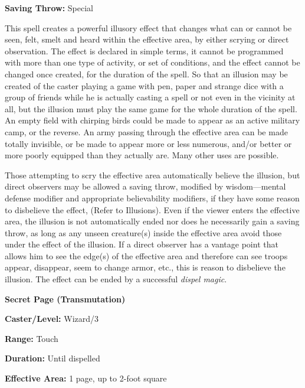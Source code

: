 \begin{multicols}{2}
\begin{minipage}{\columnwidth}
\noindent \textbf{Saving Throw:} Special

\end{minipage}

This spell creates a powerful illusory effect that changes what can or cannot be seen, felt, smelt and heard within the effective area, by either scrying or direct observation.  The effect is declared in simple terms, it cannot be programmed with more than one type of activity, or set of conditions, and the effect cannot be changed once created, for the duration of the spell.  So that an illusion may be created of the caster playing a game with pen, paper and strange dice with a group of friends while he is actually casting a spell or not even in the vicinity at all, but the illusion must play the same game for the whole duration of the spell.  An empty field with chirping birds could be made to appear as an active military camp, or the reverse.  An army passing through the effective area can be made totally invisible, or be made to appear more or less numerous, and/or better or more poorly equipped than they actually are.  Many other uses are possible.

Those attempting to scry the effective area automatically believe the illusion, but direct observers may be allowed a saving throw, modified by wisdom---mental defense modifier and appropriate believability modifiers, if they have some reason to disbelieve the effect, (Refer to Illusions).  Even if the viewer enters the effective area, the illusion is not automatically ended nor does he necessarily gain a saving throw, as long as any unseen creature(s) inside the effective area avoid those under the effect of the illusion.  If a direct observer has a vantage point that allows him to see the edge(s) of the effective area and therefore can see troops appear, disappear, seem to change armor, etc., this is reason to disbelieve the illusion.  The effect can be ended by a successful \textit{dispel magic}.

\vspace{1em}

\noindent
\begin{minipage}{\columnwidth}

\noindent \textbf{Secret Page (Transmutation)}

\noindent \textbf{Caster/Level:} Wizard/3

\noindent \textbf{Range:} Touch

\noindent \textbf{Duration:} Until dispelled

\noindent \textbf{Effective Area:} 1 page, up to 2-foot square


\end{minipage}
\end{multicols}
